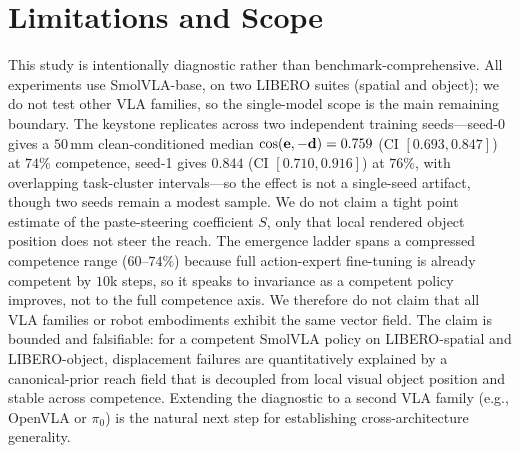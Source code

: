 \section{Limitations and Scope}
\label{sec:limitations}

This study is intentionally diagnostic rather than benchmark-comprehensive. All experiments use SmolVLA-base, on two LIBERO suites (spatial and object); we do not test other VLA families, so the single-model scope is the main remaining boundary. The keystone replicates across two independent training seeds---seed-0 gives a $50$\,mm clean-conditioned median $\operatorname{cos}(\mathbf{e},-\mathbf{d})=0.759$ (CI $[0.693,0.847]$) at $74\%$ competence, seed-1 gives $0.844$ (CI $[0.710,0.916]$) at $76\%$, with overlapping task-cluster intervals---so the effect is not a single-seed artifact, though two seeds remain a modest sample. We do not claim a tight point estimate of the paste-steering coefficient $S$, only that local rendered object position does not steer the reach. The emergence ladder spans a compressed competence range ($60$--$74\%$) because full action-expert fine-tuning is already competent by $10$k steps, so it speaks to invariance as a competent policy improves, not to the full competence axis. We therefore do not claim that all VLA families or robot embodiments exhibit the same vector field. The claim is bounded and falsifiable: for a competent SmolVLA policy on LIBERO-spatial and LIBERO-object, displacement failures are quantitatively explained by a canonical-prior reach field that is decoupled from local visual object position and stable across competence. Extending the diagnostic to a second VLA family (e.g., OpenVLA or $\pi_0$) is the natural next step for establishing cross-architecture generality.
